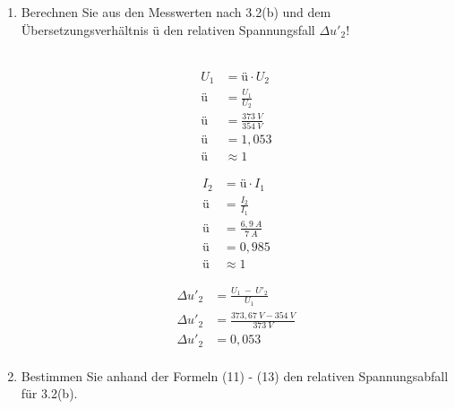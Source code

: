 \begin{enumerate}[label=\alph*)]
	\item Berechnen Sie aus den Messwerten nach 3.2(b) und dem Übersetzungsverhältnis ü
	      den relativen Spannungsfall $\Delta u'_2$!\\ \ \\

	      \begin{minipage}[r]{0.5\linewidth}
		      \begin{align*}
			      U_1 & = ü\cdot U_2            \\
			      ü   & = \frac{U_1}{U_2}       \\
			      ü   & = \frac{373\ V}{354\ V} \\
			      ü   & = 1,053                 \\
			      ü   & \approx 1
		      \end{align*}
	      \end{minipage}
	      \begin{minipage}[l]{0.5\linewidth}
		      \begin{align*}
			      I_2 & = ü\cdot I_1          \\
			      ü   & = \frac{I_2}{I_1}     \\
			      ü   & = \frac{6,9\ A}{7\ A} \\
			      ü   & = 0,985               \\
			      ü   & \approx 1
		      \end{align*}
	      \end{minipage}
	      \begin{align*}
		      \Delta u'_2 & = \frac{U_1\ -\ U'_2}{U_1}          \\
		      \Delta u'_2 & = \frac{373,67\ V - 354\ V}{373\ V} \\
		      \Delta u'_2 & = 0,053                             \\
	      \end{align*}
	\item Bestimmen Sie anhand der Formeln (11) - (13) den relativen Spannungsabfall für
	      3.2(b).


\end{enumerate}

